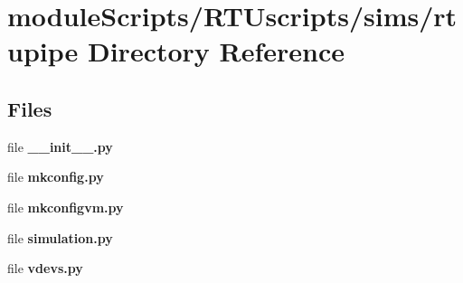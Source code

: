 \section{module\+Scripts/\+R\+T\+Uscripts/sims/rtupipe Directory Reference}
\label{dir_e912b98247d3c7faf105ff28889c7fe6}
\subsection*{Files}
\begin{DoxyCompactItemize}
\item 
file {\bf \+\_\+\+\_\+init\+\_\+\+\_\+.\+py}
\item 
file {\bf mkconfig.\+py}
\item 
file {\bf mkconfigvm.\+py}
\item 
file {\bf simulation.\+py}
\item 
file {\bf vdevs.\+py}
\end{DoxyCompactItemize}
